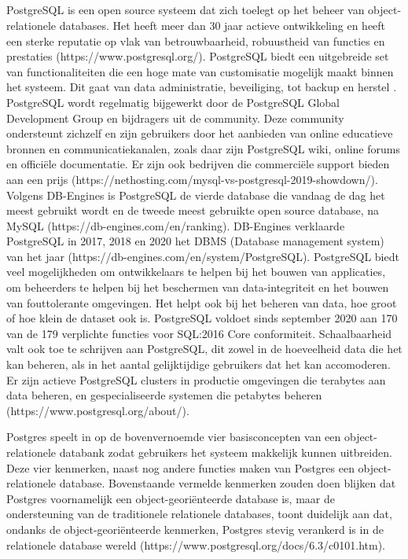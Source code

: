 \subsection{}
\label{subsec:PostgreSQL}


PostgreSQL is een open source systeem dat zich toelegt op het beheer van object-relationele databases. Het heeft meer dan 30 jaar actieve ontwikkeling en heeft een sterke reputatie op vlak van betrouwbaarheid, robuustheid van functies en prestaties (https://www.postgresql.org/). PostgreSQL biedt een uitgebreide set van functionaliteiten die een hoge mate van customisatie mogelijk maakt binnen het systeem. Dit gaat van data administratie, beveiliging, tot backup en herstel . PostgreSQL wordt regelmatig bijgewerkt door de PostgreSQL Global Development Group en bijdragers uit de community. Deze community ondersteunt zichzelf en zijn gebruikers door het aanbieden van online educatieve bronnen en communicatiekanalen, zoals daar zijn PostgreSQL wiki, online forums en officiële documentatie. Er zijn ook bedrijven die commerciële support bieden aan een prijs (https://nethosting.com/mysql-vs-postgresql-2019-showdown/). Volgens DB-Engines is PostgreSQL de vierde database die vandaag de dag het meest gebruikt wordt en de tweede meest gebruikte open source database, na MySQL (https://db-engines.com/en/ranking). DB-Engines verklaarde PostgreSQL in 2017, 2018 en 2020 het DBMS (Database management system) van het jaar (https://db-engines.com/en/system/PostgreSQL). PostgreSQL biedt veel mogelijkheden om ontwikkelaars te helpen bij het bouwen van applicaties, om beheerders te helpen bij het beschermen van data-integriteit en het bouwen van fouttolerante omgevingen. Het helpt ook bij het beheren van data, hoe groot of hoe klein de dataset ook is. PostgreSQL voldoet sinds september 2020 aan 170 van de 179 verplichte functies voor SQL:2016 Core conformiteit. Schaalbaarheid valt ook toe te schrijven aan PostgreSQL, dit zowel in de hoeveelheid data die het kan beheren, als in het aantal gelijktijdige gebruikers dat het kan accomoderen. Er zijn actieve PostgreSQL clusters in productie omgevingen die terabytes aan data beheren, en gespecialiseerde systemen die petabytes beheren (https://www.postgresql.org/about/).

Postgres speelt in op de bovenvernoemde vier basisconcepten van een object-relationele databank zodat gebruikers het systeem makkelijk kunnen uitbreiden. Deze vier kenmerken, naast nog andere functies maken van Postgres een object-relationele database. Bovenstaande vermelde kenmerken zouden doen blijken dat Postgres voornamelijk een object-georiënteerde database is, maar de ondersteuning van de traditionele relationele databases, toont duidelijk aan dat, ondanks de object-georiënteerde kenmerken, Postgres stevig verankerd is in de relationele database wereld (https://www.postgresql.org/docs/6.3/c0101.htm).







